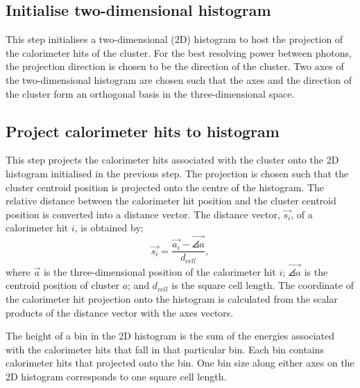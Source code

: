 \subsection{Initialise  two-dimensional histogram}

This step initialises a two-dimensional (2D) histogram to host the projection of the calorimeter hits of the cluster. For the best resolving power between photons, the projection direction is chosen to be the direction of the cluster. Two axes of the two-dimensional histogram are chosen such that the axes and the direction of the cluster form an orthogonal basis  in the three-dimensional space.




\subsection{Project calorimeter hits to histogram}

This step projects the calorimeter hits associated with the cluster onto the 2D histogram initialised in the previous step. The projection is chosen such that the cluster centroid position is projected onto the centre of the histogram. The relative distance between the calorimeter hit position and the cluster centroid position is converted into a distance vector. The distance vector, $\vec{s_{i}}$, of a calorimeter hit $i$, is obtained by:
\begin{equation}
\vec{s_{i}} = \frac{\vec{a_{i}} -  \vec{\angles{a}}}{d_{cell}},
\end{equation}
where $\vec{a}$ is the three-dimensional position of the calorimeter hit $i$;  $\vec{\angles{a}}$ is the centroid position of cluster $a$; and $d_{cell}$ is the  \ECAL square cell length. The coordinate of the calorimeter hit projection onto the histogram is calculated from the scalar products of the distance vector with the axes vectors.

The height of a bin in the 2D histogram is the sum of the energies associated with the calorimeter hits that fall in that particular bin. Each bin contains calorimeter hits that projected onto the bin. One bin size along either axes on the 2D histogram corresponds to one \ECAL square cell length.


